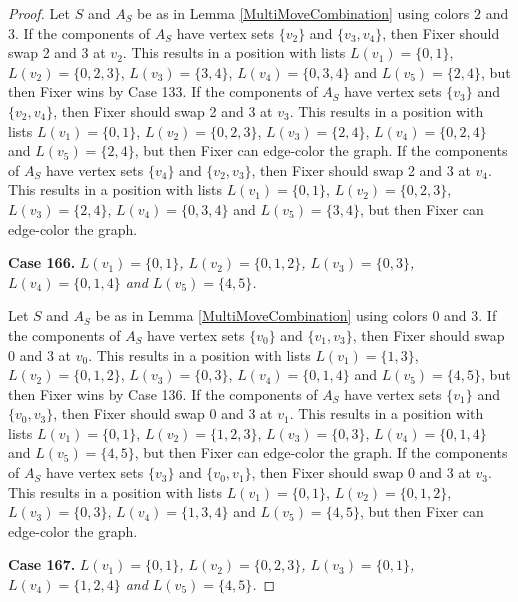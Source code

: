 \documentclass[12pt]{amsart}
\theoremstyle{plain}
\theoremstyle{definition}
\theoremstyle{remark}
\begin{document}
\begin{proof}
Let $S$ and $A_S$ be as in Lemma \ref{MultiMoveCombination} using colors $2$ and $3$. If the components of $A_S$ have vertex sets $\{v_2\}$ and $\{v_3, v_4\}$, then Fixer should swap 2 and 3 at $v_2$. This results in a position with lists $L(v_1) = \{0, 1\}$, $L(v_2) = \{0, 2, 3\}$, $L(v_3) = \{3, 4\}$, $L(v_4) = \{0, 3, 4\}$ and $L(v_5) = \{2, 4\}$, but then Fixer wins by Case 133.
If the components of $A_S$ have vertex sets $\{v_3\}$ and $\{v_2, v_4\}$, then Fixer should swap 2 and 3 at $v_3$. This results in a position with lists $L(v_1) = \{0, 1\}$, $L(v_2) = \{0, 2, 3\}$, $L(v_3) = \{2, 4\}$, $L(v_4) = \{0, 2, 4\}$ and $L(v_5) = \{2, 4\}$, but then Fixer can edge-color the graph.
If the components of $A_S$ have vertex sets $\{v_4\}$ and $\{v_2, v_3\}$, then Fixer should swap 2 and 3 at $v_4$. This results in a position with lists $L(v_1) = \{0, 1\}$, $L(v_2) = \{0, 2, 3\}$, $L(v_3) = \{2, 4\}$, $L(v_4) = \{0, 3, 4\}$ and $L(v_5) = \{3, 4\}$, but then Fixer can edge-color the graph.

\noindent\textbf{Case 166.  }\textit{$L(v_1) = \{0, 1\}$, $L(v_2) = \{0, 1, 2\}$, $L(v_3) = \{0, 3\}$, $L(v_4) = \{0, 1, 4\}$ and $L(v_5) = \{4, 5\}$.}

Let $S$ and $A_S$ be as in Lemma \ref{MultiMoveCombination} using colors $0$ and $3$. If the components of $A_S$ have vertex sets $\{v_0\}$ and $\{v_1, v_3\}$, then Fixer should swap 0 and 3 at $v_0$. This results in a position with lists $L(v_1) = \{1, 3\}$, $L(v_2) = \{0, 1, 2\}$, $L(v_3) = \{0, 3\}$, $L(v_4) = \{0, 1, 4\}$ and $L(v_5) = \{4, 5\}$, but then Fixer wins by Case 136.
If the components of $A_S$ have vertex sets $\{v_1\}$ and $\{v_0, v_3\}$, then Fixer should swap 0 and 3 at $v_1$. This results in a position with lists $L(v_1) = \{0, 1\}$, $L(v_2) = \{1, 2, 3\}$, $L(v_3) = \{0, 3\}$, $L(v_4) = \{0, 1, 4\}$ and $L(v_5) = \{4, 5\}$, but then Fixer can edge-color the graph.
If the components of $A_S$ have vertex sets $\{v_3\}$ and $\{v_0, v_1\}$, then Fixer should swap 0 and 3 at $v_3$. This results in a position with lists $L(v_1) = \{0, 1\}$, $L(v_2) = \{0, 1, 2\}$, $L(v_3) = \{0, 3\}$, $L(v_4) = \{1, 3, 4\}$ and $L(v_5) = \{4, 5\}$, but then Fixer can edge-color the graph.

\noindent\textbf{Case 167.  }\textit{$L(v_1) = \{0, 1\}$, $L(v_2) = \{0, 2, 3\}$, $L(v_3) = \{0, 1\}$, $L(v_4) = \{1, 2, 4\}$ and $L(v_5) = \{4, 5\}$.}


\end{proof}
\end{document}
